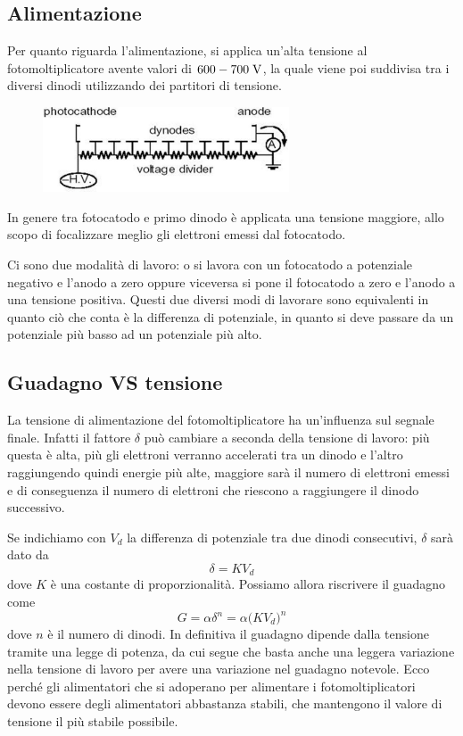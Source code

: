 \subsection{Alimentazione}
Per quanto riguarda l'alimentazione, si applica un'alta tensione al fotomoltiplicatore avente valori di $600-700 \rm \; V$, la quale viene poi suddivisa tra i diversi dinodi utilizzando dei partitori di tensione.
\begin{figure}[H]
   \centering
   \includegraphics[width=0.65\textwidth]{immagini/partitore_tensione.png}
\end{figure}
In genere tra fotocatodo e primo dinodo è applicata una tensione maggiore, allo scopo di focalizzare meglio gli elettroni emessi dal fotocatodo.

Ci sono due modalità di lavoro: o si lavora con un fotocatodo a potenziale negativo e l'anodo a zero oppure viceversa si pone il fotocatodo a zero e l'anodo a una tensione positiva. Questi due diversi modi di lavorare sono equivalenti in quanto ciò che conta è la differenza di potenziale, in quanto si deve passare da un potenziale più basso ad un potenziale più alto. 
\subsection{Guadagno VS tensione}
La tensione di alimentazione del fotomoltiplicatore ha un'influenza sul segnale finale. Infatti il fattore $\delta$ può cambiare a seconda della tensione di lavoro: più questa è alta, più gli elettroni verranno accelerati tra un dinodo e l'altro raggiungendo quindi energie più alte, maggiore sarà il numero di elettroni emessi e di conseguenza il numero di elettroni che riescono a raggiungere il dinodo successivo.

Se indichiamo con $V_d$ la differenza di potenziale tra due dinodi consecutivi, $\delta$ sarà dato da
\begin{equation*}
   \delta=K V_d
\end{equation*}
dove $K$ è una costante di proporzionalità. Possiamo allora riscrivere il guadagno come
\begin{equation*}
   G=\alpha \delta^n
   =\alpha \bigl( KV_d \bigr)^n
\end{equation*}
dove $n$ è il numero di dinodi. In definitiva il guadagno dipende dalla tensione tramite una legge di potenza, da cui segue che basta anche una leggera variazione nella tensione di lavoro per avere una variazione nel guadagno notevole. Ecco perché gli alimentatori che si adoperano per alimentare i fotomoltiplicatori devono essere degli alimentatori abbastanza stabili, che mantengono il valore di tensione il più stabile possibile.

